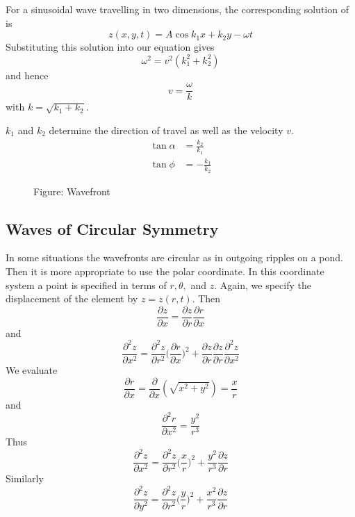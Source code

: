 \documentclass[../../../main.tex]{subfiles}
\begin{document}
For a sinusoidal wave travelling in two dimensions, the corresponding solution of is
\begin{equation*}
    z(x,y,t)=A\cos k_1x+k_2y-\omega t
\end{equation*}
Substituting this solution into our equation gives
\begin{equation*}
    \omega^2=v^2(k_1^2+k_2^2)
\end{equation*}
and hence
\begin{equation*}
    v=\frac{\omega}{k}
\end{equation*}
with $k=\sqrt{k_1+k_2}$.

$k_1$ and $k_2$ determine the direction of travel as well as the velocity $v$.
\begin{align*}
    \tan \alpha&=\frac{k_2}{k_1}\\
    \tan\phi&=-\frac{k_1}{k_2}
\end{align*}

\begin{figure*}
    \centering
    \caption*{Figure: Wavefront}
\end{figure*}

\subsection{Waves of Circular Symmetry}
In some situations the wavefronts are circular as in outgoing ripples on a pond. Then it is more appropriate to use the polar coordinate. In this coordinate system a point is speciﬁed in terms of $r, \theta,$ and $z$. Again, we specify the displacement of the element by $z=z(r,t)$. Then
\begin{equation*}
    \frac{\partial z}{\partial x}=\frac{\partial z}{\partial r}\frac{\partial r}{\partial x}
\end{equation*}
and
\begin{equation*}
    \frac{\partial^2 z}{\partial x^2}=\frac{\partial^2 z}{\partial r^2}\biggl(\frac{\partial r}{\partial x}\biggr)^2+ \frac{\partial z}{\partial r}\frac{\partial z}{\partial r}\frac{\partial^2 z}{\partial x^2}
\end{equation*}
We evaluate
\begin{equation*}
    \frac{\partial r}{\partial x}=\frac{\partial }{\partial x}(\sqrt{x^2+y^2}) = \frac{x}{r}
\end{equation*}
and
\begin{equation*}
    \frac{\partial^2 r}{\partial x^2}= \frac{y^2}{r^3}
\end{equation*}
Thus
\begin{equation*}
    \frac{\partial^2 z}{\partial x^2}= \frac{\partial^2 z}{\partial r^2}\biggl(\frac{x}{r}\biggr)^2 + \frac{y^2}{r^3}\frac{\partial z}{\partial r}
\end{equation*}
Similarly
\begin{equation*}
    \frac{\partial^2 z}{\partial y^2}= \frac{\partial^2 z}{\partial r^2}\biggl(\frac{y}{r}\biggr)^2 + \frac{x^2}{r^3}\frac{\partial z}{\partial r}
\end{equation*}
\end{document}
